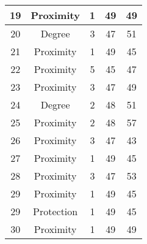 \documentclass[results.tex]{subfiles}
\begin{document}
\begin{center}
\begin{tabular}{| c || c | c | c | c |}
            \hline
            19                      & Proximity                    & 1                      & 49                      & 49                   \\
            \hline
            20                      & Degree                       & 3                      & 47                      & 51                   \\
            \hline
            21                      & Proximity                    & 1                      & 49                      & 45                   \\
            \hline
            22                      & Proximity                    & 5                      & 45                      & 47                   \\
            \hline
            23                      & Proximity                    & 3                      & 47                      & 49                   \\
            \hline
            24                      & Degree                       & 2                      & 48                      & 51                   \\
            \hline
            25                      & Proximity                    & 2                      & 48                      & 57                   \\
            \hline
            26                      & Proximity                    & 3                      & 47                      & 43                   \\
            \hline
            27                      & Proximity                    & 1                      & 49                      & 45                   \\
            \hline
            28                      & Proximity                    & 3                      & 47                      & 53                   \\
            \hline
            29                      & Proximity                    & 1                      & 49                      & 45                   \\
            \hline
            29                      & Protection                   & 1                      & 49                      & 45                   \\
            \hline
            30                      & Proximity                    & 1                      & 49                      & 49                   \\

\end{tabular}
\end{center}
\end{document}
